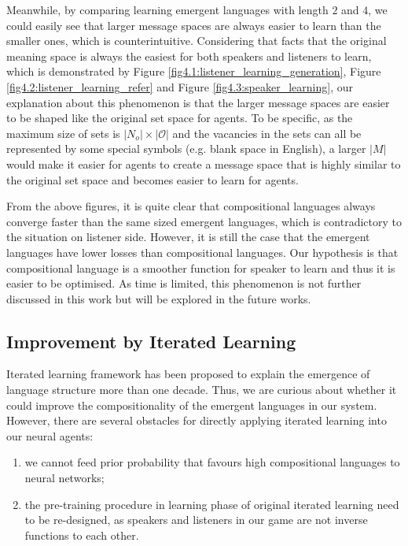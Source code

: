 Meanwhile, by comparing learning emergent languages with length $2$ and $4$, we could easily see that larger message spaces are always easier to learn than the smaller ones, which is counterintuitive. Considering that facts that the original meaning space is always the easiest for both speakers and listeners to learn, which is demonstrated by Figure \ref{fig4.1:listener_learning_generation}, Figure \ref{fig4.2:listener_learning_refer} and Figure \ref{fig4.3:speaker_learning}, our explanation about this phenomenon is that the larger message spaces are easier to be shaped like the original set space for agents. To be specific, as the maximum size of sets is  $|N_o|\times |\mathcal{O}|$ and the vacancies in the sets can all be represented by some special symbols (e.g. blank space in English), a larger $|M|$ would make it easier for agents to create a message space that is highly similar to the original set space and becomes easier to learn for agents.

From the above figures, it is quite clear that compositional languages always converge faster than the same sized emergent languages, which is contradictory to the situation on listener side. However, it is still the case that the emergent languages have lower losses than compositional languages. Our hypothesis is that compositional language is a smoother function for speaker to learn and thus it is easier to be optimised. As time is limited, this phenomenon is not further discussed in this work but will be explored in the future works.

\subsection{Improvement by Iterated Learning}
\label{ssec4.3.:iterated_learning_improve}

Iterated learning framework \cite{kirby2002emergence} has been proposed to explain the emergence of language structure more than one decade. Thus, we are curious about whether it could improve the compositionality of the emergent languages in our system. However, there are several obstacles for directly applying iterated learning into our neural agents:

\begin{enumerate}
    \item we cannot feed prior probability that favours high compositional languages to neural networks;
    \item the pre-training procedure in learning phase of original iterated learning need to be re-designed, as speakers and listeners in our game are not inverse functions to each other.
\end{enumerate}


